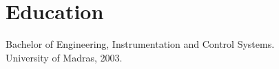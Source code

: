 \documentclass[margin]{res}
\begin{document}
\begin{resume}
\begin{itemize}
 \end{itemize}

\section{Education} 
Bachelor of Engineering, Instrumentation and Control Systems.\\
University of Madras, 2003.


\end{resume} 
\end{document}
